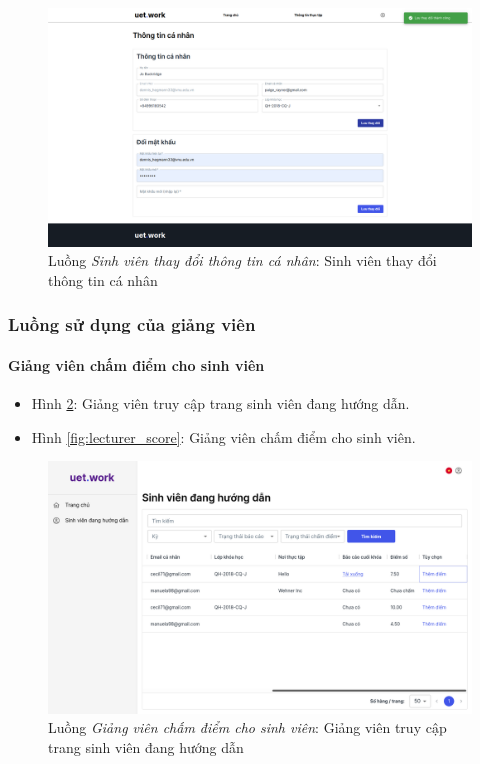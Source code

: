 \documentclass[./../main.tex]{subfiles}
\begin{document}
\begin{figure}[]
	\includegraphics[width=\linewidth]{./images/image46.png}
	\caption{Luồng \emph{Sinh viên thay đổi thông tin cá nhân}: Sinh viên thay đổi thông tin cá nhân}
	\label{fig:student_edit_info}
\end{figure}

\subsubsection{Luồng sử dụng của giảng viên}

\paragraph*{Giảng viên chấm điểm cho sinh viên}

\begin{itemize}
	\item Hình \ref{fig:lecturer_access_students_page}: Giảng viên truy cập trang sinh viên đang hướng dẫn.
	\item Hình \ref{fig:lecturer_score}: Giảng viên chấm điểm cho sinh viên.
\end{itemize}

\begin{figure}[]
	\includegraphics[width=\linewidth]{./images/image64.png}
	\caption{Luồng \emph{Giảng viên chấm điểm cho sinh viên}: Giảng viên truy cập trang sinh viên đang hướng dẫn}
	\label{fig:lecturer_access_students_page}
\end{figure}
\end{document}
